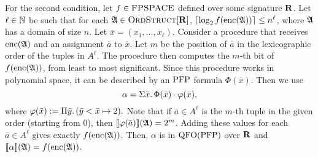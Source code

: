 For the second condition, let $f\in \text{\sc FPSPACE}$ defined over some signature $\mathbf{R}$.
Let $\ell\in\mathbb{N}$ be such that for each $\mathfrak{A}\in\text{\sc OrdStruct}[\mathbf{R}]$, $\lceil\log_2 f({\rm enc}(\mathfrak{A})) \rceil \leq n^\ell$, where $\mathfrak{A}$ has a domain of size $n$.
Let $\bar{x} = (x_1,\ldots,x_{\ell})$.
Consider a procedure that receives ${\rm enc}(\mathfrak{A})$ and an assignment $\bar{a}$ to $\bar{x}$. Let $m$ be the position of $\bar{a}$ in the lexicographic order of the tuples in $A^{\ell}$. The procedure then computes the $m$-th bit of $f({\rm enc}(\mathfrak{A}))$, from least to most significant. Since this procedure works in polynomial space, it can be described by an ${\rm PFP}$ formula $\Phi(\bar{x})$. Then we use
$$
\alpha = \Sigma{\bar{x}}.\, \Phi(\bar{x})\cdot\varphi(\bar{x}),
$$
where $\varphi(\bar{x}) := \Pi{\bar{y}}.\,(\bar{y} < \bar{x} \mapsto 2).$ Note that if $\bar{a} \in A^{\ell}$ is the $m$-th tuple in the given order (starting from 0), then ${\llbracket{}{\varphi(\bar{a})}\rrbracket}(\mathfrak{A}) = 2^{m}$. Adding these values for each $\bar{a}\in A^{\ell}$ gives exactly $f({\rm enc}(\mathfrak{A}))$. Then, $\alpha$ is in ${\rm QFO}({\rm PFP})$ over $\mathbf{R}$ and ${\llbracket{}{\alpha}\rrbracket}(\mathfrak{A}) = f({\rm enc}(\mathfrak{A}))$.
